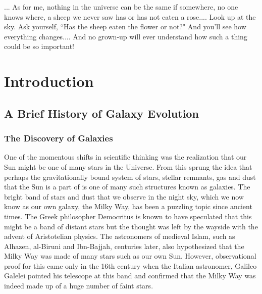\begin{savequote}[75mm]

... As for me, nothing in the universe can be the same if somewhere, no one knows where, a sheep we never saw has or has not eaten a rose....
Look up at the sky. Ask yourself, ``Has the sheep eaten the flower or not?" And you'll see how everything changes....
And no grown-up will ever understand how such a thing could be so important!
\end{savequote}


\chapter{Introduction}
\label{introduction}

\section{A Brief History of Galaxy Evolution}

\subsection{The Discovery of Galaxies}
One of the momentous shifts in scientific thinking was the realization that our Sun might be one of many stars in the Universe. From this sprung the idea that perhaps the gravitationally bound system of stars, stellar remnants, gas and dust that the Sun is a part of is one of many such structures known as galaxies. The bright band of stars and dust that we observe in the night sky, which we now know as our own galaxy, the Milky Way, has been a puzzling topic since ancient times. The Greek philosopher Democritus is known to have speculated that this might be a band of distant stars but the thought was left by the wayside with the advent of Aristotelian physics. The astronomers of medieval Islam, such as Alhazen, al-Biruni and Ibn-Bajjah, centuries later, also hypothesized that the Milky Way was made of many stars such as our own Sun. However, observational proof for this came only in the 16th century when the Italian astronomer, Galileo Galelei pointed his telescope at this band and confirmed that the Milky Way was indeed made up of a huge number of faint stars.\\

